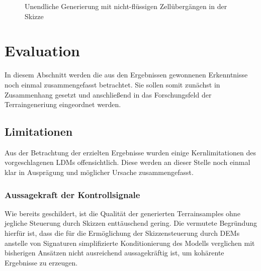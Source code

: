\begin{figure}[htbp]
    \centering

    \vspace{-8pt}

    \caption{Unendliche Generierung mit nicht-flüssigen Zellübergängen in der Skizze}
    \label{fig:disconnected}
\end{figure}

\clearpage

\section{Evaluation}

In diesem Abschnitt werden die aus den Ergebnissen gewonnenen Erkenntnisse noch einmal zusammengefasst betrachtet. Sie sollen somit zunächst in Zusammenhang gesetzt und anschließend in das Forschungsfeld der Terraingeneriung eingeordnet werden.

\subsection{Limitationen}

Aus der Betrachtung der erzielten Ergebnisse wurden einige Kernlimitationen des vorgeschlagenen \ac{LDM}s offensichtlich. Diese werden an dieser Stelle noch einmal klar in Ausprägung und möglicher Ursache zusammengefasst.

\subsubsection{Aussagekraft der Kontrollsignale}

Wie bereits geschildert, ist die Qualität der generierten Terrainsamples ohne jegliche Steuerung durch Skizzen enttäuschend gering. Die vermutete Begründung hierfür ist, dass die für die Ermöglichung der Skizzensteuerung durch \ac{DEM}s anstelle von Signaturen simplifizierte Konditionierung des Modells verglichen mit bisherigen Ansätzen nicht ausreichend aussagekräftig ist, um kohärente Ergebnisse zu erzeugen. 

